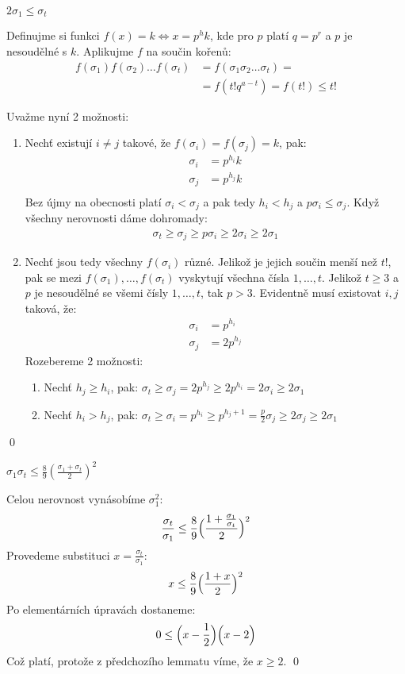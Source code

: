 \lm $2 \sigma_1 \leq \sigma_t$

\dk Definujme si funkci $f(x) = k \Leftrightarrow x = p^hk$, kde pro $p$ platí $q = p^r$ a $p$ je nesoudělné s $k$. Aplikujme $f$ na součin kořenů:
\begin{align*}
f(\sigma_1)f(\sigma_2) \dots f(\sigma_t) &= f(\sigma_1\sigma_2 \dots \sigma_t) =\\
&= f(t!q^{a-t}) = f(t!) \leq t!
\end{align*}

Uvažme nyní 2 možnosti:
\begin{enumerate}
\item Nechť existují $i \neq j$ takové, že $f(\sigma_i) = f(\sigma_j) = k$, pak:
\begin{align*}
\sigma_i &= p^{h_i}k \\
\sigma_j &= p^{h_j}k \\
\end{align*}
Bez újmy na obecnosti platí $\sigma_i < \sigma_j$ a pak tedy $h_i < h_j$ a $p\sigma_i \leq \sigma_j$. Když všechny nerovnosti dáme dohromady:
\begin{align*}
\sigma_t \geq \sigma_j \geq p\sigma_i \geq 2\sigma_i \geq 2\sigma_1
\end{align*}
\item Nechť jsou tedy všechny $f(\sigma_i)$ různé. Jelikož je jejich součin menší než $t!$, pak se mezi $f(\sigma_1),\dots ,f(\sigma_t)$ vyskytují všechna čísla $1,\dots,t$. Jelikož $t \geq 3$ a $p$ je nesoudělné se všemi čísly $1,\dots,t$, tak $p > 3$. Evidentně musí existovat $i,j$ taková, že:
\begin{align*}
\sigma_i &= p^{h_i} \\
\sigma_j &= 2p^{h_j}
\end{align*}
Rozebereme 2 možnosti:
\begin{enumerate}
\item Nechť $h_j \geq h_i$, pak: $\sigma_t \geq \sigma_j = 2p^{h_j} \geq 2p^{h_i} = 2\sigma_i \geq 2\sigma_1$
\item Nechť $h_i > h_j$, pak: $\sigma_t \geq \sigma_i = p^{h_i} \geq p^{h_j + 1} = \frac{p}{2}\sigma_j \geq 2\sigma_j \geq 2\sigma_1$
\end{enumerate}
\end{enumerate}
\qed

\lm $\sigma_1\sigma_t \leq \frac{8}{9}(\frac{\sigma_1 + \sigma_t}{2})^2$

\dk Celou nerovnost vynásobíme $\sigma^2_1$:
\begin{align*}
\frac{\sigma_t}{\sigma_1} \leq \frac{8}{9}\Bigl(\frac{1 + \frac{\sigma_1}{\sigma_t}}{2}\Bigr)^2
\end{align*}
Provedeme substituci $x = \frac{\sigma_t}{\sigma_1}$:
\begin{align*}
x \leq \frac{8}{9}\Bigl(\frac{1 + x}{2}\Bigr)^2
\end{align*}
Po elementárních úpravách dostaneme:
\begin{align*}
0 \leq \Bigl(x - \frac{1}{2}\Bigr)\Bigl(x - 2\Bigr)
\end{align*}
Což platí, protože z předchozího lemmatu víme, že $x \geq 2$. \qed


